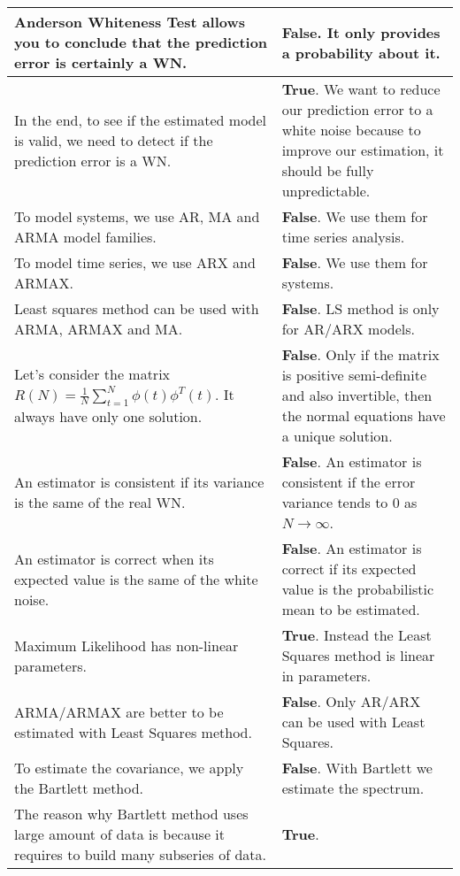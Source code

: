 \documentclass[10pt,a4paper]{article}
\begin{document}
\begin{center}
\begin{tabular}{ | m{200pt} | m{200pt}| }
\hline
Anderson Whiteness Test allows you to conclude that the prediction error is certainly a WN. & \textbf{False}. It only provides a probability about it.
     \\ \hline
     In the end, to see if the estimated model is valid, we need to detect if the prediction error is a WN. & \textbf{True}. We want to reduce our prediction error to a white noise because to improve our estimation, it should be fully unpredictable.
     \\ \hline
     To model systems, we use AR, MA and ARMA model families. & \textbf{False}. We use them for time series analysis.
     \\ \hline
     To model time series, we use ARX and ARMAX. & \textbf{False}. We use them for systems.
     \\ \hline
     Least squares method can be used with ARMA, ARMAX and MA. & \textbf{False}. LS method is only for AR/ARX models.
     \\ \hline
     Let's consider the matrix $R(N)=\frac{1}{N}\sum_{t=1}^N\phi(t)\phi^T(t)$. It always have only one solution. & \textbf{False}. Only if the matrix is positive semi-definite and also invertible, then the normal equations have a unique solution.
     \\ \hline
     An estimator is consistent if its variance is the same of the real WN. 
     & \textbf{False}. An estimator is consistent if the error variance tends to 0 as $N \rightarrow \infty$.
     \\ \hline
     An estimator is correct when its expected value is the same of the white noise. & \textbf{False}. An estimator is correct if its expected value is the probabilistic mean to be estimated.
     \\ \hline
     Maximum Likelihood has non-linear parameters. & \textbf{True}. Instead the Least Squares method is linear in parameters.
    \\ \hline
    ARMA/ARMAX are better to be estimated with Least Squares method. 
    & \textbf{False}. Only AR/ARX can be used with Least Squares.
    \\ \hline
    To estimate the covariance, we apply the Bartlett method. & \textbf{False}. With Bartlett we estimate the spectrum.
    \\ \hline
    The reason why Bartlett method uses large amount of data is because it requires to build many subseries of data. & \textbf{True}.

\end{tabular}
\end{center}
\end{document}
